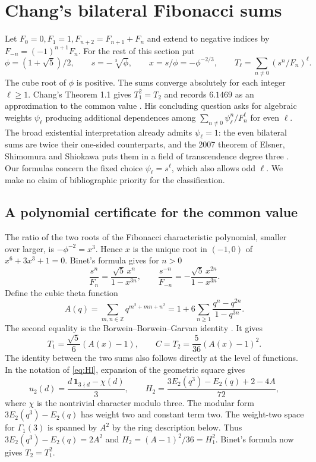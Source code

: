 \documentclass[11pt,a4paper]{article}
\theoremstyle{definition}
\theoremstyle{remark}
\newcommand{\Z}{\mathbb Z}
\numberwithin{equation}{section}
\begin{document}
\section{Chang's bilateral Fibonacci sums}\label{sec:chang}
Let $F_0=0,F_1=1,F_{n+2}=F_{n+1}+F_n$ and extend to negative
indices by $F_{-n}=(-1)^{n+1}F_n$. For the rest of this section put
\[
 \phi=(1+\sqrt5)/2,\qquad s=-\sqrt[3]{\phi},\qquad
 x=s/\phi=-\phi^{-2/3},\qquad T_\ell=\sum_{n\ne0}(s^n/F_n)^\ell.
\]
The cube root of $\phi$ is positive. The sums converge absolutely for each integer $\ell\ge1$. Chang's Theorem 1.1 gives $T_1^2=T_2$ and records $6.1469$ as an approximation to the common value \cite{Chang}. His concluding question asks for algebraic weights $\psi_\ell$ producing additional dependences among $\sum_{n\ne0}\psi_\ell^n/F_n^\ell$ for even $\ell$. The broad existential interpretation already admits $\psi_\ell=1$: the even bilateral sums are twice their one-sided counterparts, and the 2007 theorem of Elsner, Shimomura and Shiokawa puts them in a field of transcendence degree three \cite{ESS}. Our formulas concern the fixed choice $\psi_\ell=s^\ell$, which also allows odd $\ell$. We make no claim of bibliographic priority for the classification.

\subsection{A polynomial certificate for the common value}
The ratio of the two roots of the Fibonacci characteristic polynomial, smaller over larger, is $-\phi^{-2}=x^3$. Hence $x$ is the unique root in $(-1,0)$ of $x^6+3x^3+1=0$. Binet's formula gives for $n>0$
\[
 \frac{s^n}{F_n}=\frac{\sqrt5\,x^n}{1-x^{3n}},
 \qquad \frac{s^{-n}}{F_{-n}}=-\frac{\sqrt5\,x^{2n}}{1-x^{3n}} .
\]
Define the cubic theta function
\[
 A(q)=\sum_{m,n\in\Z}q^{m^2+mn+n^2}
     =1+6\sum_{n\ge1}\frac{q^n-q^{2n}}{1-q^{3n}}.
\]
The second equality is the Borwein--Borwein--Garvan identity
\cite[Eq.~(2.25)]{BBG}. It gives
\begin{equation}\label{eq:ChangC}
 T_1=\frac{\sqrt5}{6}(A(x)-1),\qquad
 C=T_2=\frac5{36}(A(x)-1)^2.
\end{equation}
The identity between the two sums also follows directly at the level of functions. In the notation of \eqref{eq:Hl}, expansion of the geometric square gives
\[
 u_2(d)=\frac{d\,\mathbf 1_{3\nmid d}-\chi(d)}{3},\qquad
 H_2=\frac{3E_2(q^3)-E_2(q)+2-4A}{72},
\]
where $\chi$ is the nontrivial character modulo three. The modular form $3E_2(q^3)-E_2(q)$ has weight two and constant term two. The weight-two space for $\Gamma_1(3)$ is spanned by $A^2$ by the ring description below. Thus $3E_2(q^3)-E_2(q)=2A^2$ and $H_2=(A-1)^2/36=H_1^2$. Binet's formula now gives $T_2=T_1^2$.
\end{document}
